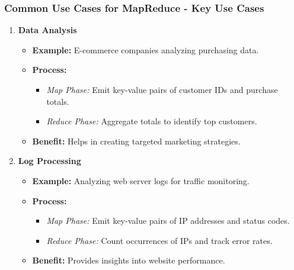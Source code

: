 \documentclass[aspectratio=169]{beamer}
\begin{document}
\begin{frame}[fragile]
    \frametitle{Common Use Cases for MapReduce - Key Use Cases}
    \begin{enumerate}
        \item \textbf{Data Analysis}
        \begin{itemize}
            \item \textbf{Example:} E-commerce companies analyzing purchasing data.
            \item \textbf{Process:} 
            \begin{itemize}
                \item \textit{Map Phase:} Emit key-value pairs of customer IDs and purchase totals.
                \item \textit{Reduce Phase:} Aggregate totals to identify top customers.
            \end{itemize}
            \item \textbf{Benefit:} Helps in creating targeted marketing strategies.
        \end{itemize}
        
        \item \textbf{Log Processing}
        \begin{itemize}
            \item \textbf{Example:} Analyzing web server logs for traffic monitoring.
            \item \textbf{Process:} 
            \begin{itemize}
                \item \textit{Map Phase:} Emit key-value pairs of IP addresses and status codes.
                \item \textit{Reduce Phase:} Count occurrences of IPs and track error rates.
            \end{itemize}
            \item \textbf{Benefit:} Provides insights into website performance.
        \end{itemize}
    \end{enumerate}
\end{frame}
\end{document}
